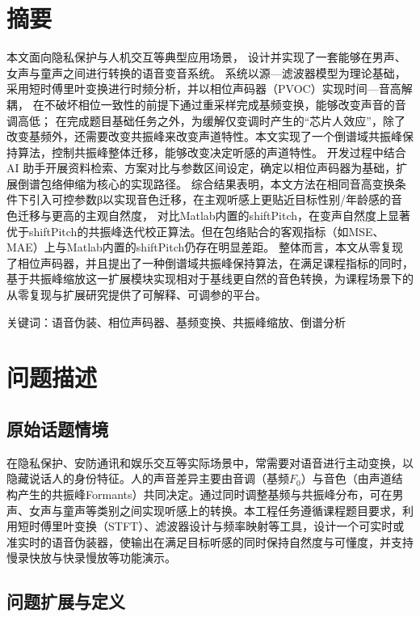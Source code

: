 \documentclass[12pt,a4paper]{article}
\begin{document}
\section*{摘要}
本文面向隐私保护与人机交互等典型应用场景，
设计并实现了一套能够在男声、女声与童声之间进行转换的语音变音系统。
系统以源—滤波器模型为理论基础，采用短时傅里叶变换进行时频分析，并以相位声码器（PVOC）实现时间—音高解耦，
在不破坏相位一致性的前提下通过重采样完成基频变换，能够改变声音的音调高低；
在完成题目基础任务之外，为缓解仅变调时产生的“芯片人效应”，除了改变基频外，还需要改变共振峰来改变声道特性。本文实现了一个倒谱域共振峰保持算法，控制共振峰整体迁移，能够改变决定听感的声道特性。
开发过程中结合 AI 助手开展资料检索、方案对比与参数区间设定，确定以相位声码器为基础，扩展倒谱包络伸缩为核心的实现路径。
综合结果表明，本文方法在相同音高变换条件下引入可控参数β以实现音色迁移，在主观听感上更贴近目标性别/年龄感的音色迁移与更高的主观自然度，
对比Matlab内置的shiftPitch，在变声自然度上显著优于shiftPitch的共振峰迭代校正算法。但在包络贴合的客观指标（如MSE、MAE）上与Matlab内置的shiftPitch仍存在明显差距。
整体而言，本文从零复现了相位声码器，并且提出了一种倒谱域共振峰保持算法，在满足课程指标的同时，基于共振峰缩放这一扩展模块实现相对于基线更自然的音色转换，为课程场景下的从零复现与扩展研究提供了可解释、可调参的平台。


关键词：语音伪装、相位声码器、基频变换、共振峰缩放、倒谱分析



\section{问题描述}

\subsection {原始话题情境}

在隐私保护、安防通讯和娱乐交互等实际场景中，常需要对语音进行主动变换，以隐藏说话人的身份特征。人的声音差异主要由音调（基频$F_0$）与音色（由声道结构产生的共振峰Formants）共同决定。通过同时调整基频与共振峰分布，可在男声、女声与童声等类别之间实现听感上的转换。本工程任务遵循课程题目要求，利用短时傅里叶变换（STFT）、滤波器设计与频率映射等工具，设计一个可实时或准实时的语音伪装器，使输出在满足目标听感的同时保持自然度与可懂度，并支持慢录快放与快录慢放等功能演示。

\subsection {问题扩展与定义}
\end{document}

